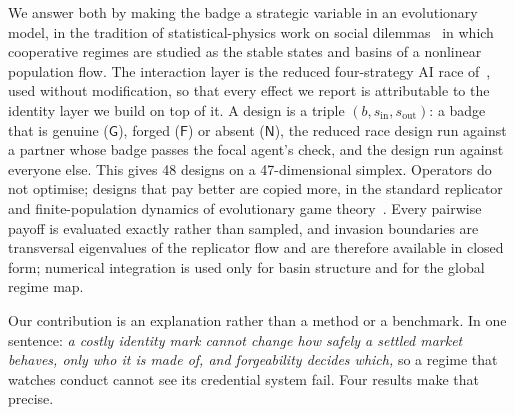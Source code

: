 \documentclass[preprint,12pt]{elsarticle}
\theoremstyle{plain}
\theoremstyle{definition}
\begin{document}
We answer both by making the badge a strategic variable in an evolutionary
model, in the tradition of statistical-physics work on social
dilemmas~\citep{perc2017statphys} in which cooperative regimes are studied as
the stable states and basins of a nonlinear population flow. The interaction
layer is the reduced four-strategy AI race of~\citet{domingos2026falling}, used
without modification, so that every effect we report is attributable to the
identity layer we build on top of it. A design is a triple
$(b, s_{\mathrm{in}}, s_{\mathrm{out}})$: a badge that is genuine
($\mathsf{G}$), forged ($\mathsf{F}$) or absent ($\mathsf{N}$), the reduced race
design run against a partner whose badge passes the focal agent's check, and the
design run against everyone else. This gives 48 designs on a 47-dimensional
simplex. Operators do not optimise; designs that pay better are copied more, in
the standard replicator and finite-population dynamics of evolutionary game
theory~\citep{taylor1978ess,hofbauer1998evolutionary,traulsen2006stochastic}.
Every pairwise payoff is evaluated exactly rather than sampled, and invasion
boundaries are transversal eigenvalues of the replicator flow and are therefore
available in closed form; numerical integration is used only for basin
structure and for the global regime map.

Our contribution is an explanation rather than a method or a benchmark. In one
sentence: \emph{a costly identity mark cannot change how safely a settled market
behaves, only who it is made of, and forgeability decides which,} so a regime
that watches conduct cannot see its credential system fail. Four results make
that precise.
\end{document}
